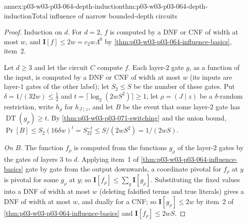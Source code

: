 \begin{annexitem}{annex:p03-w03-p03-064-depth-induction}{thm:p03-w03-p03-064-depth-induction}{Total influence of narrow bounded-depth circuits}
\begin{proof}
Induction on \(d\).  For \(d=2\), \(f\) is computed by a DNF or CNF of width
at most \(w\), and \(\mathbf I[f]\leq2w=c_2w\Lambda^0\) by
\cref{thm:p03-w03-p03-064-influence-basics}, item~2.

Let \(d\geq3\) and let the circuit \(C\) compute \(f\).  Each layer-\(2\)
gate \(g\), as a function of the input, is computed by a DNF or CNF of width
at most \(w\) (its inputs are layer-\(1\) gates of the other label); let
\(S_2\leq S\) be the number of these gates.  Put \(\delta=1/(32w)\leq\frac12\)
and \(t=\lceil\log_2(2wS^2)\rceil\geq1\), let \(\rho=(J\mid z)\) be a
\(\delta\)-random restriction, write \(h_\rho\) for \(h_{J\mid z}\), and let \(B\) be the event that some
layer-\(2\) gate has \(\operatorname{DT}(g_\rho)\geq t\).  By
\cref{thm:p03-w03-p03-071-switching} and the union bound,
\(\Pr[B]\leq S_2(16\delta w)^t=S_22^{-t}\leq S/(2wS^2)=1/(2wS)\).

\emph{On \(B\).}  The function \(f_\rho\) is computed from the functions
\(g_\rho\) of the layer-\(2\) gates by the gates of layers \(3\) to \(d\).
Applying item~1 of \cref{thm:p03-w03-p03-064-influence-basics} gate by gate
from the output downwards, a coordinate pivotal for \(f_\rho\) at \(y\) is
pivotal for some \(g_\rho\) at \(y\); so
\(\mathbf I[f_\rho]\leq\sum_g\mathbf I[g_\rho]\).  Substituting the fixed
values into a DNF of width at most \(w\) (deleting falsified terms and true
literals) gives a DNF of width at most \(w\), and dually for a CNF; so
\(\mathbf I[g_\rho]\leq2w\) by item~2 of
\cref{thm:p03-w03-p03-064-influence-basics} and \(\mathbf I[f_\rho]\leq2wS\).


\end{proof}
\end{annexitem}
